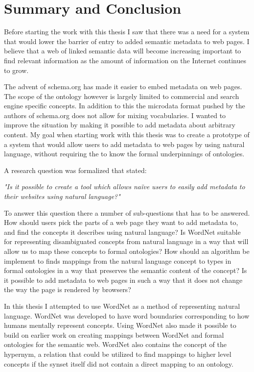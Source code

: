 \chapter{Summary and Conclusion} %
\label{Conclusion} %
Before starting the work with this thesis I saw that there was a need for a system that would lower the barrier of
entry to added semantic metadata to web pages.
I believe that a web of linked semantic data will become increasing important to find relevant information as the amount
of information on the Internet continues to grow.

The advent of schema.org has made it easier to embed metadata on web pages.
The scope of the ontology however is largely limited to commercial and search engine specific concepts.
In addition to this the microdata format pushed by the authors of schema.org does not allow for mixing vocabularies.
I wanted to improve the situation by making it possible to add metadata about arbitrary content.
My goal when starting work with this thesis was to create a prototype of a system that would allow users to add metadata to web pages by using natural language,
without requiring the to know the formal underpinnings of ontologies.

A research question was formalized that stated:

\emph{"Is it possible to create a tool which allows naïve users to easily add metadata to their websites using natural language?"}

To answer this question there a number of sub-questions that has to be answered.
How should users pick the parts of a web page they want to add metadata to, and find the concepts it describes using natural language?
Is WordNet suitable for representing disambiguated concepts from natural language in a way that will allow us to map these concepts to formal ontologies?
How should an algorithm be implement to finds mappings from the natural language concept to types in
formal ontologies in a way that preserves the semantic content of the concept?
Is it possible to add metadata to web pages in such a way that it does not change the way the page is rendered by browsers?

In this thesis I attempted to use WordNet as a method of representing natural language.
WordNet was developed to have word boundaries corresponding to how humans mentally represent concepts.
Using WordNet also made it possible to  build on earlier work on creating mappings between WordNet and formal ontologies for the semantic web.
WordNet also contains the concept of the hypernym, a relation that could be utilized to find mappings to higher level concepts
if the synset itself did not contain a direct mapping to an ontology.

